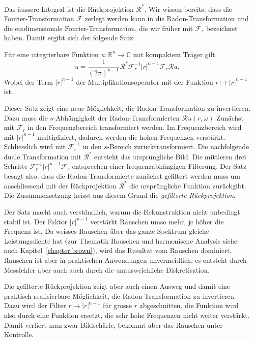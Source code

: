 Das äussere Integral ist die Rückprojektion $\mathscr{R}^*$.
Wir wissen bereits, dass die Fourier-Transformation $\mathscr{F}$
zerlegt werden kann in die Radon-Transformation und die
eindimensionale Fourier-Transformation, die wir früher mit
$\mathscr{F}_r$ bezeichnet haben.
Damit ergibt sich der folgende Satz:

\begin{satz}
Für eine integrierbare Funktion $u\colon\mathbb{R}^n\to\mathbb{C}$ mit kompaktem Träger gilt
\[
u
=
\frac{1}{(2\pi)^{n-1}}
\mathscr{R}^*
\mathscr{F}_r^{-1}
|r|^{n-1}
\mathscr{F}_r
\mathscr{R}u,
\]
Wobei der Term $|r|^{n-1}$ der Multiplikationsoperator mit der
Funktion $r\mapsto |r|^{n-1}$ ist.
\end{satz}

Dieser Satz zeigt eine neue Möglichkeit, die Radon-Transformation
zu invertieren.
Dazu muss die $s$-Abhängigkeit der Radon-Transformierten
$\mathscr{R}u(r,\omega)$ 
Zunächst mit $\mathscr{F}_r$ in den Frequenzbereich transformiert werden.
Im Frequenzbereich wird mit $|r|^{n-1}$ multipliziert, dadurch
werden die hohen Frequenzen verstärkt.
Schliesslich wird mit $\mathscr{F}_r^{-1}$ in den $s$-Bereich
zurücktransformiert.
Die nachfolgende duale Transformation mit $\mathscr{R}^*$ entsteht
das ursprüngliche Bild.
Die mittleren drei Schritte $\mathscr{F}_r^{-1}|r|^{n-1}\mathscr{F}_r$
entsprechen einer frequenzabhängigen Filterung.
Der Satz besagt also, dass die Radon-Transformierte zunächst
gefiltert werden muss um anschliessend mit der Rückprojektion
$\mathscr{R}^*$ die ursprüngliche Funktion zurückgibt.
Die Zusammensetzung heisst aus diesem Grund die {\em gefilterte
Rückprojektion}.

Der Satz macht auch verständlich, warum die Rekunstruktion nicht
unbedingt stabil ist. 
Der Faktor $|r|^{n-1}$ verstärkt Rauschen umso mehr, je höher
die Frequenz ist.
Da weisses Rauschen über das ganze Spektrum gleiche Leistungsdichte
hat (zur Thematik Rauschen und harmonische Analysis siehe auch 
Kapitel~\ref{chapter:brown}),
wird das Resultat vom Rauschen dominiert.
Rauschen ist aber in praktischen Anwendungen unvermeidlich, es
entsteht durch Messfehler aber auch auch durch die unausweichliche
Diskretisation.

Die gefilterte Rückprojektion zeigt aber auch einen Ausweg und 
damit eine praktisch realisierbare Möglichkeit, die Radon-Transformation
zu invertieren.
Dazu wird der Filter $r\mapsto |r|^{n-1}$ für grosse $r$ abgeschnitten,
die Funktion wird also durch eine Funktion ersetzt, die sehr
hohe Frequenzen nicht weiter verstärkt.
Damit verliert man zwar Bildschärfe, bekommt aber das Rauschen unter
Kontrolle.

